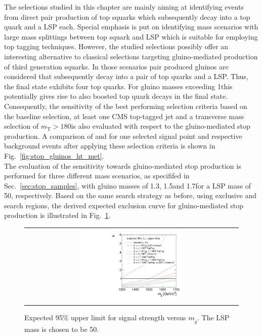 The selections studied in this chapter are mainly aiming at identifying events from direct pair production of top squarks which subsequently decay into a top quark and a LSP each. Special emphasis is put on identifying mass scenarios with large mass splittings between top squark and LSP which is suitable for employing top tagging techniques. However, the studied selections possibly offer an interesting alternative to classical selections targeting gluino-mediated production of third generation squarks. In those scenarios pair produced gluinos are considered that subsequently decay into a pair of top quarks and a LSP. Thus, the final state exhibits four top quarks. For gluino masses exceeding 1\tev this potentially gives rise to also boosted top quark decays in the final state. Consequently, the sensitivity of the best performing selection criteria based on the baseline selection, at least one CMS top-tagged jet and a transverse mass selection of $m_\mathrm{T} > 180$\gev is also evaluated with respect to the gluino-mediated stop production. A comparison of \HT and \met for one selected signal point and respective background events after applying these selection criteria is shown in Fig.~\ref{fig:stop_gluinos_ht_met}. \\
The evaluation of the sensitivity towards gluino-mediated stop production is performed for three different mass scenarios, as specififed in Sec.~\ref{sec:stop_samples}, with gluino masses of 1.3\tev, 1.5\tev and 1.7\tev for a LSP mass of 50\gev, respectively. Based on the same search strategy as before, using exclusive \HT and \met search regions, the derived expected exclusion curve for gluino-mediated stop production is illustrated in Fig.~\ref{fig:stop_gluino_mediated_limit}. \\
\begin{figure}[!h]
  \centering
  \begin{tabular}{c}
                \includegraphics[width=0.49\textwidth]{figures/limitplot4BinSel_T1tttt.pdf} 
  \end{tabular}
  \caption{Expected 95\% upper limit for signal strength versus $m_{\tilde{g}}$. The LSP mass is chosen to be 50\gev.}
  \label{fig:stop_gluino_mediated_limit}
\end{figure}

